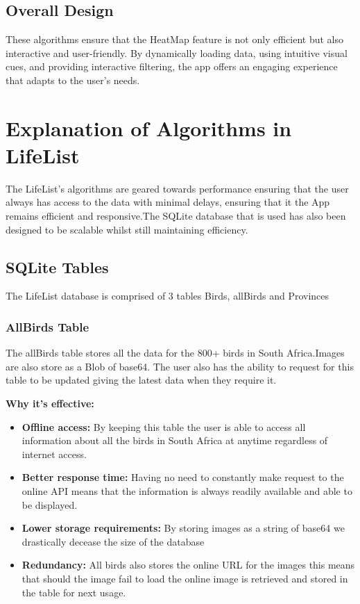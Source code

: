 \documentclass{article}
\begin{document}
\subsection{Overall Design}
These algorithms ensure that the HeatMap feature is not only efficient but also interactive and user-friendly. By dynamically loading data, using intuitive visual cues, and providing interactive filtering, the app offers an engaging experience that adapts to the user's needs.

\section{Explanation of Algorithms in LifeList}
The LifeList's algorithms are geared towards performance ensuring that the user always has access to the data with minimal delays, ensuring that it the App remains efficient and responsive.The SQLite database that is used has also been designed to be scalable whilst still maintaining efficiency. 

\subsection{SQLite Tables}
The LifeList database is comprised of 3 tables Birds, allBirds and Provinces

\subsubsection{AllBirds Table}
The allBirds table stores all the data for the 800+ birds in South Africa.Images are also store as a Blob of base64. The user also has the ability to request for this table to be updated giving the latest data when they require it.

\textbf{Why it's effective:}
\begin{itemize}
    \item \textbf{Offline access:} By keeping this table the user is able to access all information about all the birds in South Africa at anytime regardless of internet access.
    \item \textbf{Better response time:} Having no need to constantly make request to the online API means that the information is always readily available and able to be displayed.
    \item \textbf{Lower storage requirements:} By storing images as a string of base64 we drastically decease the size of the database 
    \item \textbf{Redundancy:} All birds also stores the online URL for the images this means that should the image fail to load the online image is retrieved and stored in the table for next usage.
\end{itemize}
\end{document}
